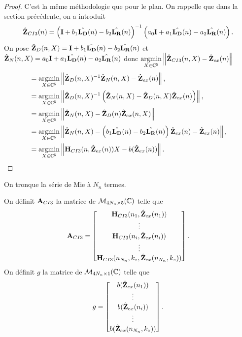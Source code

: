     \begin{proof}
      C'est la même méthodologie que pour le plan.
      On rappelle que dans la section précédente, on a introduit
      \begin{equation*}
        \hat{\mathbf{Z}}_{CI3}(n) = \left(\mathbf{I} + b_1 \hat{\mathbf{L_D}}(n) - b_2 \hat{\mathbf{L_R}}(n) \right)^{-1}\left(a_0 \mathbf{I} + a_1 {\hat{\mathbf{L_D}}(n)} - a_2 {\hat{\mathbf{L_R}}(n)}\right).
      \end{equation*}
      On pose \(\hat{\mathbf{Z}}_D(n,X) = \mathbf{I} + b_1 \hat{\mathbf{L_D}}(n) - b_2 \hat{\mathbf{L_R}}(n)\) et \(\hat{\mathbf{Z}}_N(n,X) = a_0 \mathbf{I} + a_1 {\hat{\mathbf{L_D}}(n)} - a_2 {\hat{\mathbf{L_R}}(n)}\) donc \({\underset{X\in\mathbb C^5}{\operatorname{argmin}}} \left\lVert\hat{\mathbf{Z}}_{CI3}(n,X) - \hat{\mathbf{Z}}_{ex}(n)\right\rVert\)
      \begin{align*}
      & = {\underset{X\in\mathbb C^5}{\operatorname{argmin}}} \left\lVert\hat{\mathbf{Z}}_D(n,X)^{-1}\hat{\mathbf{Z}}_N(n,X) - \hat{\mathbf{Z}}_{ex}(n) \right\rVert,
      \\
      &= {\underset{X\in\mathbb C^5}{\operatorname{argmin}}} \left\lVert\hat{\mathbf{Z}}_D(n,X)^{-1}\left(\hat{\mathbf{Z}}_N(n,X) - \hat{\mathbf{Z}}_D(n,X)\hat{\mathbf{Z}}_{ex}(n)\right) \right\rVert,
      \\
      &= {\underset{X\in\mathbb C^5}{\operatorname{argmin}}} \left\lVert\hat{\mathbf{Z}}_N(n,X) - \hat{\mathbf{Z}}_D(n)\hat{\mathbf{Z}}_{ex}(n,X)\right\rVert
      \\
      &= {\underset{X\in\mathbb C^5}{\operatorname{argmin}}} \left\lVert\hat{\mathbf{Z}}_N(n,X) - \left(b_1 \hat{\mathbf{L_D}}(n) - b_2 \hat{\mathbf{L_R}}(n)\right)\hat{\mathbf{Z}}_{ex}(n) - \hat{\mathbf{Z}}_{ex}(n) \right\rVert,
      \\
      &= {\underset{X\in\mathbb C^5}{\operatorname{argmin}}} \left\lVert\mathbf{H}_{CI3}(n,\hat{\mathbf{Z}}_{ex}(n))X - b(\hat{\mathbf{Z}}_{ex}(n))\right\rVert.
      \end{align*}
    \end{proof}

    On tronque la série de Mie à \(N_{n}\) termes.
    \begin{defn}
      On définit \(\mathbf{A}_{CI3}\) la matrice de \(\mathcal{M}_{4N_{n}\times5}(\mathbb C)\) telle que
      \begin{equation*}
        \mathbf{A}_{CI3} = 
        \begin{bmatrix}
          \mathbf{H}_{CI3}(n_1,\hat{\mathbf{Z}}_{ex}(n_1))
          \\
          \vdots
          \\
          \mathbf{H}_{CI3}(n_i,\hat{\mathbf{Z}}_{ex}(n_i))
          \\
          \vdots
          \\
          \mathbf{H}_{CI3}(n_{N_n},k_{z},\hat{\mathbf{Z}}_{ex}(n_{N_n},k_{z}))
        \end{bmatrix}.
      \end{equation*}
      On définit \(g\) la matrice de \(\mathcal{M}_{4N_{n}\times1}(\mathbb C)\) telle que
      \begin{equation*}
        g = 
        \begin{bmatrix}
          b(\hat{\mathbf{Z}}_{ex}(n_1))
          \\
          \vdots
          \\
          b(\hat{\mathbf{Z}}_{ex}(n_i))
          \\
          \vdots
          \\
          b(\hat{\mathbf{Z}}_{ex}(n_{N_n},k_{z}))
        \end{bmatrix}.
      \end{equation*}
    \end{defn}

